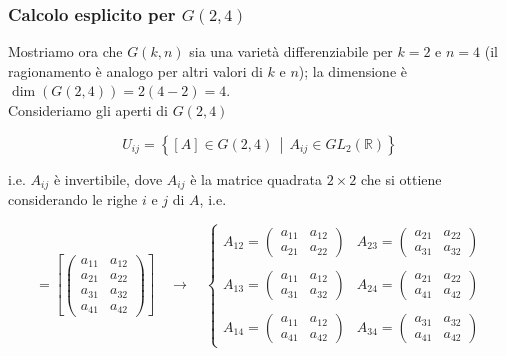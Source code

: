 \subsubsection{Calcolo esplicito per $ G(2,4) $}

Mostriamo ora che $ G(k,n) $ sia una varietà differenziabile per $ k=2 $ e $ n=4 $ (il ragionamento è analogo per altri valori di $ k $ e $ n $); la dimensione è $ \dim(G(2,4)) = 2(4-2) = 4 $.\\
Consideriamo gli aperti di $ G(2,4) $

\begin{equation}
	U_{ij} = \left\{ [A] \in G(2,4) \, \middle| \, A_{ij} \in GL_{2}(\mathbb{R}) \right\}
\end{equation}

i.e. $ A_{ij} $ è invertibile, dove $ A_{ij} $ è la matrice quadrata $ 2 \times 2 $ che si ottiene considerando le righe $ i $ e $ j $ di $ A $, i.e.

\begin{equation}
	[A] = \left[ \begin{pmatrix} a_{11} & a_{12} \\ a_{21} & a_{22} \\ a_{31} & a_{32} \\ a_{41} & a_{42} \end{pmatrix} \right] \quad \longrightarrow \quad%
	\begin{cases}
		A_{12} = \begin{pmatrix} a_{11} & a_{12} \\ a_{21} & a_{22} \end{pmatrix} & A_{23} = \begin{pmatrix} a_{21} & a_{22} \\ a_{31} & a_{32} \end{pmatrix}\\\\
		A_{13} = \begin{pmatrix} a_{11} & a_{12} \\ a_{31} & a_{32} \end{pmatrix} & A_{24} = \begin{pmatrix} a_{21} & a_{22} \\ a_{41} & a_{42} \end{pmatrix}\\\\
		A_{14} = \begin{pmatrix} a_{11} & a_{12} \\ a_{41} & a_{42} \end{pmatrix} & A_{34} = \begin{pmatrix} a_{31} & a_{32} \\ a_{41} & a_{42} \end{pmatrix}
	\end{cases}
\end{equation}

